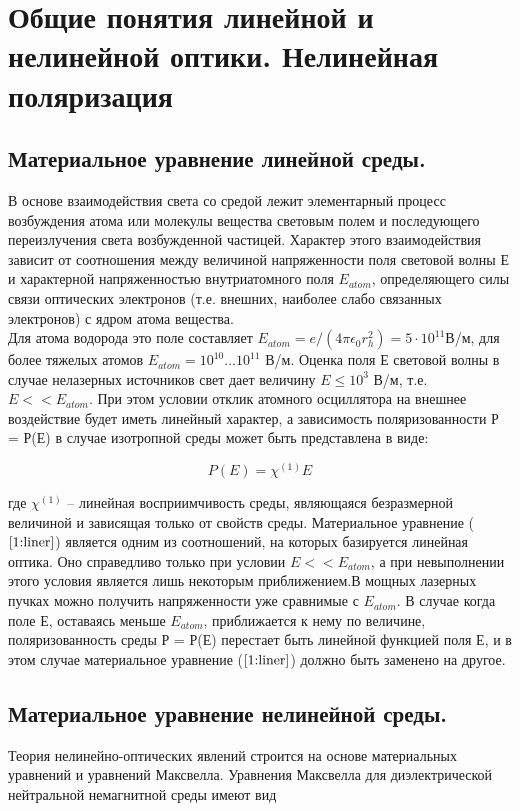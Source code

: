 \section{Общие понятия линейной и нелинейной оптики. Нелинейная поляризация}
\subsection{Материальное уравнение линейной среды.}
В основе взаимодействия света со средой лежит элементарный
процесс возбуждения атома или молекулы вещества световым полем и последующего переизлучения света возбужденной частицей. Характер этого взаимодействия зависит от соотношения между величиной напряженности поля световой волны Е и характерной напряженностью внутриатомного поля $E_{atom}$, определяющего силы связи оптических электронов (т.е. внешних, наиболее слабо связанных электронов) с ядром атома вещества.
\\
Для атома водорода это поле составляет $ E_{atom} = e/(4\pi\epsilon_{0}r_{h}^2) = 5\cdot10^{11} $В/м, для более тяжелых атомов $ E_{atom} = 10^{10} \dots 10^{11} $ В/м. Оценка поля Е световой волны в случае нелазерных источников свет дает величину $E \le 10^3$ В/м, т.е. $E<<E_{atom} $. При этом условии отклик атомного осциллятора на внешнее воздействие будет иметь линейный характер, а зависимость поляризованности Р = Р(Е) в случае изотропной среды может быть представлена в виде:

\begin{equation}\label{1:liner}
P(E) = \chi^{(1)}E
\end{equation}

где $ \chi^{(1)}$ – линейная восприимчивость среды, являющаяся безразмерной величиной и зависящая только от свойств среды.
Материальное уравнение ($\ref{1:liner}$) является одним из соотношений, на которых базируется линейная оптика.  Оно справедливо только при условии $E << E_{atom} $, а при невыполнении этого условия является лишь некоторым приближением.В мощных лазерных пучках можно получить напряженности уже сравнимые с $E_{atom} $. В случае когда поле Е, оставаясь меньше $E_{atom} $, приближается к нему по величине, поляризованность среды Р = Р(Е) перестает быть линейной функцией поля Е, и в этом случае материальное уравнение ($\ref{1:liner}$) должно быть заменено на другое.

\subsection{Материальное уравнение нелинейной среды.} 
Теория нелинейно-оптических явлений строится на основе материальных уравнений и уравнений
Максвелла. Уравнения Максвелла для диэлектрической нейтральной немагнитной среды имеют вид

